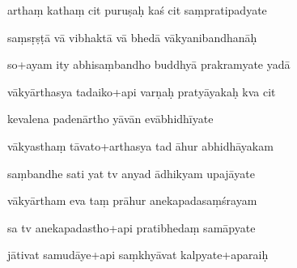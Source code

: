 \documentclass[article,12pt,a4paper]{memoir}%
\newcounter{parCount}
\begin{document}
	  
	  \pstart {} arthaṃ kathaṃ cit puruṣaḥ kaś cit saṃpratipadyate 
	{}
	\pend%
      

	  
	  \pstart \leavevmode%
	saṃsṛṣṭā vā vibhaktā vā bhedā vākyanibandhanāḥ 
	{}
	\pend%
      

	  
	  \pstart {} so+ayam ity abhisaṃbandho buddhyā prakramyate yadā 
	{}
	\pend%
      

	  
	  \pstart \leavevmode%
	vākyārthasya tadaiko+api varṇaḥ pratyāyakaḥ kva cit 
	{}
	\pend%
      

	  
	  \pstart {} kevalena padenārtho yāvān evābhidhīyate 
	{}
	\pend%
      

	  
	  \pstart \leavevmode%
	vākyasthaṃ tāvato+arthasya tad āhur abhidhāyakam 
	{}
	\pend%
      

	  
	  \pstart {} saṃbandhe sati yat tv anyad ādhikyam upajāyate 
	{}
	\pend%
      

	  
	  \pstart \leavevmode%
	vākyārtham eva taṃ prāhur anekapadasaṃśrayam 
	{}
	\pend%
      

	  
	  \pstart {} sa tv anekapadastho+api pratibhedaṃ samāpyate 
	{}
	\pend%
      

	  
	  \pstart \leavevmode%
	jātivat samudāye+api saṃkhyāvat kalpyate+aparaiḥ 
	{}
	\pend%
      
\end{document}
